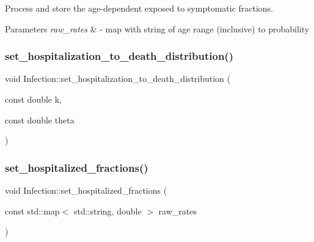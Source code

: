 Process and store the age-\/dependent exposed to symptomatic fractions. 


\begin{DoxyParams}{Parameters}
{\em raw\+\_\+rates} & -\/ map with string of age range (inclusive) to probability \\
\hline
\end{DoxyParams}
\mbox{\label{classInfection_a9550693cb076ce6ccd4335177bbbdbc8}} 
\subsubsection{\texorpdfstring{set\+\_\+hospitalization\+\_\+to\+\_\+death\+\_\+distribution()}{set\_hospitalization\_to\_death\_distribution()}}
{\footnotesize\ttfamily void Infection\+::set\+\_\+hospitalization\+\_\+to\+\_\+death\+\_\+distribution (\begin{DoxyParamCaption}\item[{const double}]{k,  }\item[{const double}]{theta }\end{DoxyParamCaption})\hspace{0.3cm}{\ttfamily [inline]}}

\mbox{\label{classInfection_ae5a3f5e20e0f22d3dede73c9c0325dbc}} 
\subsubsection{\texorpdfstring{set\+\_\+hospitalized\+\_\+fractions()}{set\_hospitalized\_fractions()}}
{\footnotesize\ttfamily void Infection\+::set\+\_\+hospitalized\+\_\+fractions (\begin{DoxyParamCaption}\item[{const std\+::map$<$ std\+::string, double $>$}]{raw\+\_\+rates }\end{DoxyParamCaption})}



